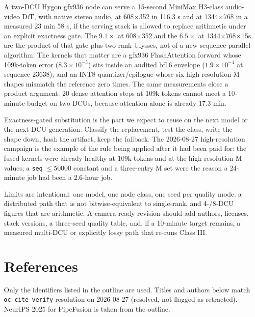 \documentclass[11pt]{article}
\begin{document}
A two-DCU Hygon gfx936 node can serve a 15-second MiniMax H3-class audio-video DiT, with native stereo audio, at 608$\times$352 in 116.3 s and at 1344$\times$768 in a measured 23 min 58 s, if the serving stack is allowed to replace arithmetic under an explicit exactness gate. The $9.1\times$ at 608$\times$352 and the $6.5\times$ at 1344$\times$768$\times$15s are the product of that gate plus two-rank Ulysses, not of a new sequence-parallel algorithm. The kernels that matter are a gfx936 FlashAttention forward whose 109k-token error ($8.3\times 10^{-5}$) sits inside an audited bf16 envelope ($1.9\times 10^{-4}$ at sequence 23638), and an INT8 quantizer/epilogue whose six high-resolution M shapes mismatch the reference zero times. The same measurements close a product argument: 20 dense attention steps at 109k tokens cannot meet a 10-minute budget on two DCUs, because attention alone is already 17.3 min.

Exactness-gated substitution is the part we expect to reuse on the next model or the next DCU generation. Classify the replacement, test the class, write the shape down, hash the artifact, keep the fallback. The 2026-08-27 high-resolution campaign is the example of the rule being applied after it had been paid for: the fused kernels were already healthy at 109k tokens and at the high-resolution M values; a \texttt{seq} $\leq 50000$ constant and a three-entry M set were the reason a 24-minute job had been a 2.6-hour job.

Limits are intentional: one model, one node class, one seed per quality mode, a distributed path that is not bitwise-equivalent to single-rank, and 4-/8-DCU figures that are arithmetic. A camera-ready revision should add authors, licenses, stack versions, a three-seed quality table, and, if a 10-minute target remains, a measured multi-DCU or explicitly lossy path that re-runs Class III.

\section*{References}

Only the identifiers listed in the outline are used. Titles and authors below match \texttt{oc-cite verify} resolution on 2026-08-27 (resolved, not flagged as retracted). NeurIPS 2025 for PipeFusion is taken from the outline.
\end{document}
